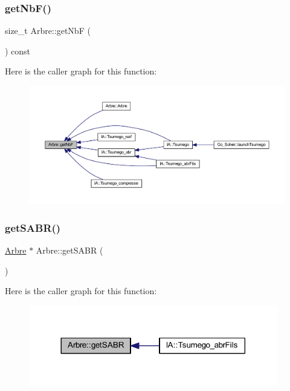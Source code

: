 \subsubsection{\texorpdfstring{get\+Nb\+F()}{getNbF()}}
{\footnotesize\ttfamily size\+\_\+t Arbre\+::get\+NbF (\begin{DoxyParamCaption}{ }\end{DoxyParamCaption}) const}

Here is the caller graph for this function\+:
\nopagebreak
\begin{figure}[H]
\begin{center}
\leavevmode
\includegraphics[width=350pt]{class_arbre_a0aef1f091d76bca13229a21fcd45a076_icgraph}
\end{center}
\end{figure}
\mbox{\label{class_arbre_afb60b996a0b7225303ff20256483f383}} 
\subsubsection{\texorpdfstring{get\+S\+A\+B\+R()}{getSABR()}\hspace{0.1cm}{\footnotesize\ttfamily [1/2]}}
{\footnotesize\ttfamily \hyperlink{class_arbre}{Arbre} $\ast$ Arbre\+::get\+S\+A\+BR (\begin{DoxyParamCaption}{ }\end{DoxyParamCaption})}

Here is the caller graph for this function\+:
\nopagebreak
\begin{figure}[H]
\begin{center}
\leavevmode
\includegraphics[width=308pt]{class_arbre_afb60b996a0b7225303ff20256483f383_icgraph}
\end{center}
\end{figure}
\mbox{\label{class_arbre_a58b7b455cffd35ffc2aeb08dc978fd2d}} 
